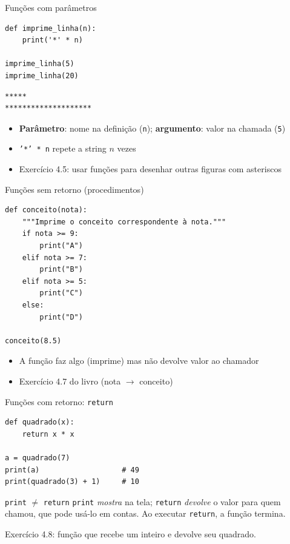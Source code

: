 \documentclass[aspectratio=169,10pt,t]{beamer}
\begin{document}
\begin{frame}[fragile]{Funções com parâmetros}
\begin{lstlisting}
def imprime_linha(n):
    print('*' * n)

imprime_linha(5)
imprime_linha(20)
\end{lstlisting}
\begin{lstlisting}[style=saida]
*****
********************
\end{lstlisting}
  \begin{itemize}
    \item \textbf{Parâmetro}: nome na definição (\texttt{n}); \textbf{argumento}: valor na chamada (\texttt{5})
    \item \texttt{'*' * n} repete a string \(n\) vezes
    \item Exercício 4.5: usar funções para desenhar outras figuras com asteriscos
  \end{itemize}
\end{frame}

\begin{frame}[fragile]{Funções sem retorno (procedimentos)}
\begin{lstlisting}
def conceito(nota):
    """Imprime o conceito correspondente à nota."""
    if nota >= 9:
        print("A")
    elif nota >= 7:
        print("B")
    elif nota >= 5:
        print("C")
    else:
        print("D")

conceito(8.5)
\end{lstlisting}
  \begin{itemize}
    \item A função \alert{faz algo} (imprime) mas não devolve valor ao chamador
    \item Exercício 4.7 do livro (nota \(\to\) conceito)
  \end{itemize}
\end{frame}

\begin{frame}[fragile]{Funções com retorno: \texttt{return}}
\begin{lstlisting}
def quadrado(x):
    return x * x

a = quadrado(7)
print(a)                   # 49
print(quadrado(3) + 1)     # 10
\end{lstlisting}
  \begin{alertblock}{\texttt{print} $\neq$ \texttt{return}}
    \texttt{print} \emph{mostra} na tela; \texttt{return} \emph{devolve} o valor para quem chamou, que pode usá-lo em contas. Ao executar \texttt{return}, a função termina.
  \end{alertblock}
  Exercício 4.8: função que recebe um inteiro e devolve seu quadrado.
\end{frame}
\end{document}

